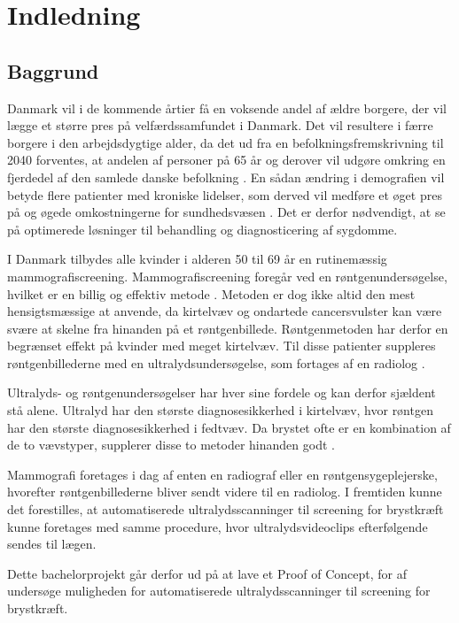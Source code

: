 \chapter{Indledning}
\section{Baggrund}
Danmark vil i de kommende årtier få en voksende andel af ældre borgere, der vil lægge et større pres på velfærdssamfundet i Danmark. Det vil resultere i færre borgere i den arbejdsdygtige alder, da det ud fra en befolkningsfremskrivning til 2040 forventes, at andelen af personer på 65 år og derover vil udgøre omkring en fjerdedel af den samlede danske befolkning \cite{Befolk}. En sådan ændring i demografien vil betyde flere patienter med kroniske lidelser, som derved vil medføre et øget pres på og øgede omkostningerne for sundhedsvæsen \cite{Pres}. Det er derfor nødvendigt, at se på optimerede løsninger til behandling og diagnosticering af sygdomme. 

I Danmark tilbydes alle kvinder i alderen 50 til 69 år en rutinemæssig mammografiscreening. Mammografiscreening foregår ved en røntgenundersøgelse, hvilket er en billig og effektiv metode \cite{Afsloring}. Metoden er dog ikke altid den mest hensigtsmæssige at anvende, da kirtelvæv og ondartede cancersvulster kan være svære at skelne fra hinanden på et røntgenbillede. Røntgenmetoden har derfor en begrænset effekt på kvinder med meget kirtelvæv. Til disse patienter suppleres røntgenbillederne med en ultralydsundersøgelse, som fortages af en radiolog \cite{Ultralyd}.

Ultralyds- og røntgenundersøgelser har hver sine fordele og kan derfor sjældent stå alene. Ultralyd har den største diagnosesikkerhed i kirtelvæv, hvor røntgen har den største diagnosesikkerhed i fedtvæv. Da brystet ofte er en kombination af de to vævstyper, supplerer disse to metoder hinanden godt \cite{Ultralyd}. 

Mammografi foretages i dag af enten en radiograf eller en røntgensygeplejerske, hvorefter røntgenbillederne bliver sendt videre til en radiolog. I fremtiden kunne det forestilles, at automatiserede ultralydsscanninger til screening for brystkræft kunne foretages med samme procedure, hvor ultralydsvideoclips efterfølgende sendes til lægen.

Dette bachelorprojekt går derfor ud på at lave et Proof of Concept, for af undersøge muligheden for automatiserede ultralydsscanninger til screening for brystkræft.
\newpage


